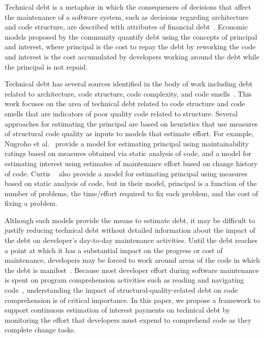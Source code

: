 Technical debt is a metaphor in which the consequences of decisions that affect the maintenance of a software system, such as decisions regarding architecture and code structure, are described with attributes of financial debt~\cite{Cunningham:1992}. Economic models proposed by the \TD community quantify debt using the concepts of principal and interest, where principal is the cost to repay the debt by reworking the code and interest is the cost accumulated by developers working around the debt while the principal is not repaid.

Technical debt has several sources identified in the body of work including debt related to architecture, code structure, code complexity, and code smells~\cite{Ozkaya2012Technical}.  This work focuses on the area of technical debt related to code structure and code smells  that are indicators of poor quality code related to structure.  Several approaches for estimating the \TD principal are based on heuristics that use measures of structural code quality as inputs to models that estimate effort. For example, Nugroho et al.~\cite{Nugroho_etal:2011} provide a model for estimating principal using maintainability ratings based on measures obtained via static analysis of code, and a model for estimating interest using estimates of maintenance effort based on change history of code. Curtis \etal~\cite{Curtis_etal:2012} also provide a model for estimating principal using measures based on static analysis of code, but in their model, principal is a function of the number of problems, the time/effort required to fix each problem, and the cost of fixing a problem.

Although such models provide the means to estimate debt, it may be difficult to justify reducing technical debt without detailed information about the impact of the debt on developer's day-to-day maintenance activities. Until the debt reaches a point at which it has a substantial impact on the progress or cost of maintenance, developers may be forced to work around areas of the code in which the debt is manifest~\cite{Ozkaya_etal:2011}. 
Because most developer effort during software maintenance is spent on program comprehension activities such as reading and navigating code~\cite{Fjeldstad_Hamlen:1982,Standish:1984,vonMayrhauser_etal:1997,Ko_etal:2006,LaToza_etal:2006,Tiarks:2011}, understanding the impact of structural-quality-related debt on code comprehension is of critical importance. In this paper, we propose a framework to support continuous estimation of interest payments on technical debt by monitoring the effort that developers must expend to comprehend code as they complete change tasks. 

